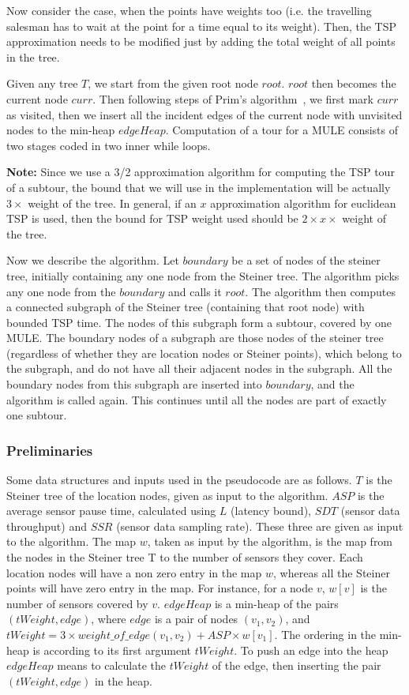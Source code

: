 Now consider the case, when the points have weights too (i.e. the travelling salesman has to wait at the point for a time equal to its weight). Then, the TSP approximation needs to be modified just by adding the total weight of all points in the tree.

Given any tree $T$, we start from the given root node $root$. $root$ then becomes the current node $curr$. Then following steps of Prim's algorithm~\cite{Prim}, we first mark $curr$ as visited, then we insert all the incident edges of the current node with unvisited nodes to the min-heap $edgeHeap$. Computation of a tour for a MULE consists of two stages coded in two inner while loops.



{\bf Note:} Since we use a 3/2 approximation algorithm \cite{christofides} for computing the TSP tour of a subtour, the bound that we will use in the implementation will be actually $3\times $ weight of the tree. In general, if an $x$ approximation algorithm for euclidean TSP is used, then the bound for TSP weight used should be $2\times x \times$ weight of the tree.

Now we describe the algorithm. Let $boundary$ be a set of nodes of the steiner tree, initially containing any one node from the Steiner tree. The algorithm picks any one node from the $boundary$ and calls it $root$. The algorithm then computes a connected subgraph of the Steiner tree (containing that root node) with bounded TSP time. The nodes of this subgraph form a subtour, covered by one MULE. The boundary nodes of a subgraph are those nodes of the steiner tree (regardless of whether they are location nodes or Steiner points), which belong to the subgraph, and do not have all their adjacent nodes in the subgraph. All the boundary nodes from this subgraph are inserted into $boundary$, and the algorithm is called again. This continues until all the nodes are part of exactly one subtour.

\subsubsection{Preliminaries}

Some data structures and inputs used in the pseudocode are as follows. $T$ is the Steiner tree of the location nodes, given as input to the algorithm. $ASP$ is the average sensor pause time, calculated using $L$ (latency bound), $SDT$ (sensor data throughput) and $SSR$ (sensor data sampling rate). These three are given as input to the algorithm. The map $w$, taken as input by the algorithm, is the map from the nodes in the Steiner tree T to the number of sensors they cover. Each location nodes will have a non zero entry in the map $w$, whereas all the Steiner points will have zero entry in the map. For instance, for a node $v$, $w[v]$ is the number of sensors covered by $v$. $edgeHeap$ is a min-heap of the pairs $(tWeight,edge)$, where $edge$ is a pair of nodes $(v_1,v_2)$, and $tWeight = 3 \times weight\_of\_edge(v_1,v_2) + ASP \times w[v_1]$. The ordering in the min-heap is according to its first argument $tWeight$. To push an edge into the heap $edgeHeap$ means to calculate the $tWeight$ of the edge, then inserting the pair $(tWeight,edge)$ in the heap.


